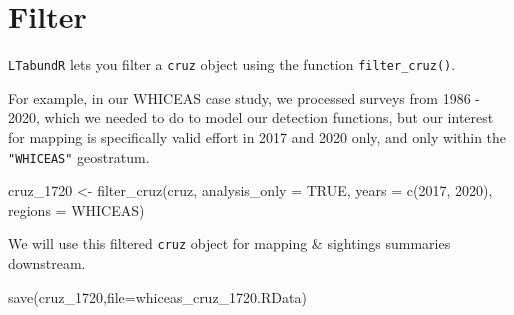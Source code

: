 \documentclass[
]{book}
\newenvironment{Shaded}{\begin{snugshade}}{\end{snugshade}}
\newcommand{\AttributeTok}[1]{\textcolor[rgb]{0.77,0.63,0.00}{#1}}
\newcommand{\ConstantTok}[1]{\textcolor[rgb]{0.00,0.00,0.00}{#1}}
\newcommand{\DecValTok}[1]{\textcolor[rgb]{0.00,0.00,0.81}{#1}}
\newcommand{\FloatTok}[1]{\textcolor[rgb]{0.00,0.00,0.81}{#1}}
\newcommand{\FunctionTok}[1]{\textcolor[rgb]{0.00,0.00,0.00}{#1}}
\newcommand{\NormalTok}[1]{#1}
\newcommand{\OtherTok}[1]{\textcolor[rgb]{0.56,0.35,0.01}{#1}}
\newcommand{\SpecialCharTok}[1]{\textcolor[rgb]{0.00,0.00,0.00}{#1}}
\newcommand{\StringTok}[1]{\textcolor[rgb]{0.31,0.60,0.02}{#1}}
\begin{document}
\begin{Shaded}
\end{Shaded}

\hypertarget{filter-1}{%
\section*{Filter}\label{filter-1}}

\texttt{LTabundR} lets you filter a \texttt{cruz} object using the function \texttt{filter\_cruz()}.

For example, in our WHICEAS case study, we processed surveys from 1986 - 2020, which we needed to do to model our detection functions, but our interest for mapping is specifically valid effort in 2017 and 2020 only, and only within the \texttt{"WHICEAS"} geostratum.

\begin{Shaded}
\begin{Highlighting}[]
\NormalTok{cruz\_1720 }\OtherTok{\textless{}{-}} 
  \FunctionTok{filter\_cruz}\NormalTok{(cruz,}
              \AttributeTok{analysis\_only =} \ConstantTok{TRUE}\NormalTok{,}
              \AttributeTok{years =} \FunctionTok{c}\NormalTok{(}\DecValTok{2017}\NormalTok{, }\DecValTok{2020}\NormalTok{),}
              \AttributeTok{regions =} \StringTok{\textquotesingle{}WHICEAS\textquotesingle{}}\NormalTok{)}
\end{Highlighting}
\end{Shaded}

We will use this filtered \texttt{cruz} object for mapping \& sightings summaries downstream.

\begin{Shaded}
\begin{Highlighting}[]
\FunctionTok{save}\NormalTok{(cruz\_1720,}\AttributeTok{file=}\StringTok{\textquotesingle{}whiceas\_cruz\_1720.RData\textquotesingle{}}\NormalTok{)}
\end{Highlighting}
\end{Shaded}
\end{document}
